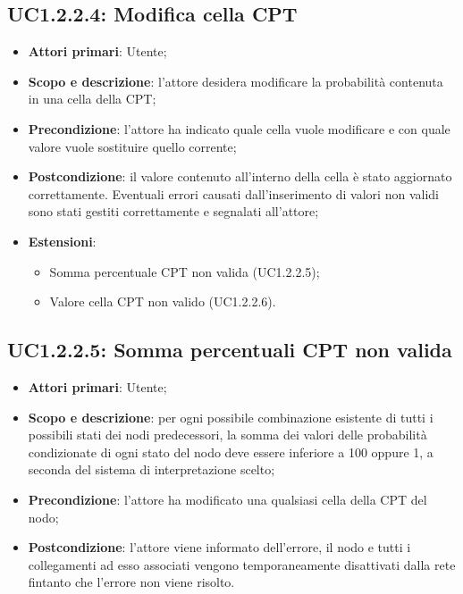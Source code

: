 \subsection{UC1.2.2.4: Modifica cella CPT} 
\hypertarget{UC1.2.2.4}{} 
\begin{itemize} 
	\item{\textbf{Attori primari}: Utente;} 
	\item{\textbf{Scopo e descrizione}: l'attore desidera modificare la probabilità contenuta in una cella della CPT;} 
	\item{\textbf{Precondizione}: l'attore ha indicato quale cella vuole modificare e con quale valore vuole sostituire quello corrente;} 
	\item{\textbf{Postcondizione}: il valore contenuto all'interno della cella è stato aggiornato correttamente. Eventuali errori causati dall'inserimento di valori non validi sono stati gestiti correttamente e segnalati all'attore;}
	\item{\textbf{Estensioni}:
		\begin{itemize}
			\item{Somma percentuale CPT non valida (UC1.2.2.5);}
			\item{Valore cella CPT non valido (UC1.2.2.6).}
		\end{itemize}
	}
\end{itemize}
\subsection{UC1.2.2.5: Somma percentuali CPT non valida} 
\hypertarget{UC1.2.2.5}{} 
\begin{itemize} 
	\item{\textbf{Attori primari}: Utente;} 
	\item{\textbf{Scopo e descrizione}: per ogni possibile combinazione esistente di tutti i possibili stati dei nodi predecessori, la somma dei valori delle probabilità condizionate di ogni stato del nodo deve essere inferiore a 100 oppure 1, a seconda del sistema di interpretazione scelto;} 
	\item{\textbf{Precondizione}: l'attore ha modificato una qualsiasi cella della CPT del nodo;} 
	\item{\textbf{Postcondizione}: l'attore viene informato dell'errore, il nodo e tutti i collegamenti ad esso associati vengono temporaneamente disattivati dalla rete fintanto che l'errore non viene risolto.}
\end{itemize} 
